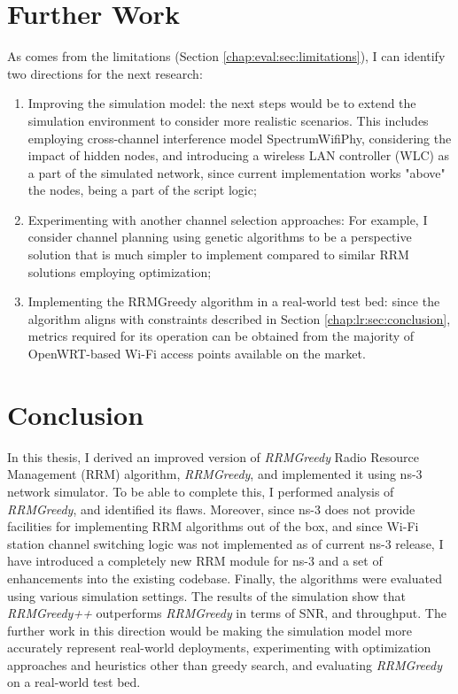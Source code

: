 \section{Further Work}
\label{chap:eval:sec:further_work}
As comes from the limitations (Section \ref{chap:eval:sec:limitations}), I can identify two directions for the next research:
\begin{enumerate}
    \item Improving the simulation model: the next steps would be to extend the simulation environment to consider more realistic scenarios. This includes employing cross-channel interference model SpectrumWifiPhy, considering the impact of hidden nodes, and introducing a wireless LAN controller (WLC) as a part of the simulated network, since current implementation works "above" the nodes, being a part of the script logic;
    \item Experimenting with another channel selection approaches: For example, I consider channel planning using genetic algorithms \cite{raschellaEvaluationChannelAssignment2019} to be a perspective solution that is much simpler to implement compared to similar RRM solutions employing optimization;
    \item Implementing the RRMGreedy algorithm in a real-world test bed: since the algorithm aligns with constraints described in Section \ref{chap:lr:sec:conclusion}, metrics required for its operation can be obtained from the majority of OpenWRT-based Wi-Fi access points available on the market.
\end{enumerate}

\section{Conclusion}
\label{chap:eval:sec:conclusion}
In this thesis, I derived an improved version of \textit{RRMGreedy} Radio Resource Management (RRM) algorithm, \textit{RRMGreedy}, and implemented it using ns-3 network simulator.
To be able to complete this, I performed analysis of \textit{RRMGreedy}, and identified its flaws.
Moreover, since ns-3 does not provide facilities for implementing RRM algorithms out of the box, and since Wi-Fi station channel switching logic was not implemented as of current ns-3 release, I have introduced a completely new RRM module for ns-3 and a set of enhancements into the existing codebase.
Finally, the algorithms were evaluated using various simulation settings. The results of the simulation show that \textit{RRMGreedy++} outperforms \textit{RRMGreedy} in terms of SNR, and throughput. The further work in this direction would be making the simulation model more accurately represent real-world deployments, experimenting with optimization approaches and heuristics other than greedy search, and evaluating \textit{RRMGreedy} on a real-world test bed.